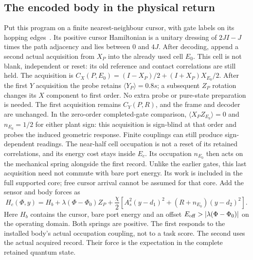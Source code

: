 \documentclass[12pt]{article}
\theoremstyle{definition}
\theoremstyle{remark}
\begin{document}
\subsection{The encoded body in the physical return}

Put this program on a finite nearest-neighbour cursor, with gate labels
on its hopping edges~\cite{CahaLandauNagaj2018}. Its positive cursor Hamiltonian is a unitary
dressing of $2JI-J$ times the path adjacency and lies between $0$ and
$4J$. After decoding, append a second actual acquisition from $X_P$
into the already used cell $E_0$. This cell is not blank, independent
or reset: its old reference and contact correlations are still held.
The acquisition is $C_X(P,E_0)=(I-X_P)/2+(I+X_P)X_{E_0}/2$.
After the first $Y$ acquisition the probe retains
$\langle Y_P\rangle=0.8s$; a subsequent $Z_P$ rotation changes its
$X$ component to first order. No extra probe or pure-state preparation
is needed. The first acquisition remains $C_Y(P,R)$, and the
frame and decoder are unchanged. In the zero-order completed-gate
comparison, $\langle X_PZ_{E_0}\rangle=0$ and $n_{E_0}=1/2$ for either
plant sign: this acquisition is sign-blind at that order and probes
the induced geometric response. Finite couplings can still produce
sign-dependent readings. The near-half cell occupation is not a reset
of its retained correlations, and its energy cost stays inside $E_c$.
Its occupation $n_{E_0}$ then acts on the mechanical spring alongside
the first record. Unlike the earlier gates, this last acquisition need
not commute with bare port energy. Its work is included in the full
supported core; free cursor arrival cannot be assumed for that core.
Add the sensor and body forces as
\begin{equation}\label{eq:formedcore}
 H_c(\Phi,y)=H_b+\lambda(\Phi-\Phi_0)Z_P+
 \frac\chi2\left[A_s^2(y-d_1)^2+(R+n_{E_0})(y-d_2)^2\right].
\end{equation}
Here $H_b$ contains the cursor, bare port energy and an offset
$E_{\rm off}>|\lambda(\Phi-\Phi_0)|$ on the operating domain.
Both springs are positive. The first responds to the installed body's
actual occupation coupling, not to a task score. The second uses the
actual acquired record. Their force is the expectation in the complete
retained quantum state.
\end{document}
